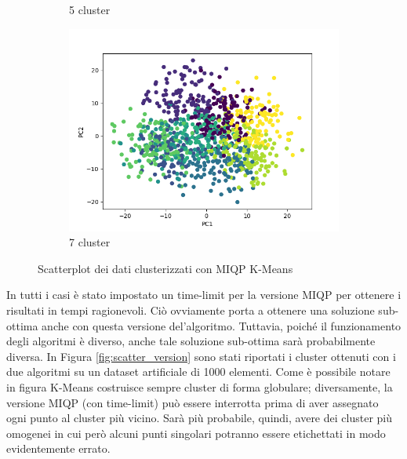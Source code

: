 \documentclass{article}
\begin{document}
\begin{figure}[h]
\begin{subfigure}[b]{0.32\linewidth}
         \caption{5 cluster}
     \end{subfigure}
     \begin{subfigure}[b]{0.32\linewidth}
         \centering
         \includegraphics[width=\linewidth]{../results/plots/scatter_k7}
         \caption{7 cluster}
     \end{subfigure}
     \caption{Scatterplot dei dati clusterizzati con MIQP K-Means}
     \label{fig:scatter_cluster}
    \end{figure}
    In tutti i casi è stato impostato un time-limit per la versione MIQP per ottenere i risultati in tempi ragionevoli. Ciò ovviamente porta a ottenere una soluzione sub-ottima anche con questa versione del'algoritmo. Tuttavia, poiché il funzionamento degli algoritmi è diverso, anche tale soluzione sub-ottima sarà probabilmente diversa. In Figura \ref{fig:scatter_version} sono stati riportati i cluster ottenuti con i due algoritmi su un dataset artificiale di 1000 elementi. Come è possibile notare in figura K-Means costruisce sempre cluster di forma globulare; diversamente, la versione MIQP (con time-limit) può essere interrotta prima di aver assegnato ogni punto al cluster più vicino. Sarà più probabile, quindi, avere dei cluster più omogenei in cui però alcuni punti singolari potranno essere etichettati in modo evidentemente errato.
\end{document}
